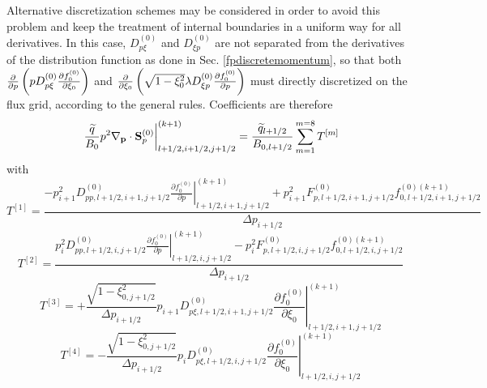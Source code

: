 Alternative discretization schemes may be considered in order to avoid this
problem and keep the treatment of internal boundaries in a uniform way for
all derivatives. In this case, $D_{p\xi }^{\left( 0\right) }$ and $D_{\xi
p}^{\left( 0\right) }$ are not separated from the derivatives of the
distribution function as done in Sec. \ref{fpdiscretemomentum}, so that both 
$\frac{\partial }{\partial p}\left( pD_{p\xi }^{\left( 0\right) }\frac{%
\partial f_{0}^{\left( 0\right) }}{\partial \xi _{0}}\right) $ and $\frac{%
\partial }{\partial \xi _{0}}\left( \sqrt{1-\xi _{0}^{2}}\lambda D_{\xi
p}^{\left( 0\right) }\frac{\partial f_{0}^{\left( 0\right) }}{\partial p}%
\right) $ must directly discretized on the flux grid, according to the
general rules. Coefficients are therefore 
\begin{equation}
\left. \frac{\widetilde{q}}{B_{0}}p^{2}\nabla _{\mathbf{p}}\cdot \mathbf{S}%
_{p}^{\left( 0\right) }\right\vert _{l+1/2,i+1/2,j+1/2}^{(k+1)}=\frac{%
\widetilde{q}_{l+1/2}}{B_{0,l+1/2}}\sum_{m=1}^{m=8}T^{\left[ m\right] }
\end{equation}%
with 
\begin{equation}
T^{\left[ 1\right] }=\frac{-p_{i+1}^{2}D_{pp,l+1/2,i+1,j+1/2}^{\left(
0\right) }\left. \frac{\partial f_{0}^{\left( 0\right) }}{\partial p}%
\right\vert
_{l+1/2,i+1,j+1/2}^{(k+1)}+p_{i+1}^{2}F_{p,l+1/2,i+1,j+1/2}^{\left( 0\right)
}f_{0,l+1/2,i+1,j+1/2}^{\left( 0\right) (k+1)}}{\Delta p_{i+1/2}}
\end{equation}%
\begin{equation}
T^{\left[ 2\right] }=\frac{p_{i}^{2}D_{pp,l+1/2,i,j+1/2}^{\left( 0\right)
}\left. \frac{\partial f_{0}^{\left( 0\right) }}{\partial p}\right\vert
_{l+1/2,i,j+1/2}^{(k+1)}-p_{i}^{2}F_{p,l+1/2,i,j+1/2}^{\left( 0\right)
}f_{0,l+1/2,i,j+1/2}^{\left( 0\right) (k+1)}}{\Delta p_{i+1/2}}
\end{equation}%
\begin{equation}
T^{\left[ 3\right] }=+\frac{\sqrt{1-\xi _{0,j+1/2}^{2}}}{\Delta p_{i+1/2}}%
p_{i+1}D_{p\xi ,l+1/2,i+1,j+1/2}^{\left( 0\right) }\left. \frac{\partial
f_{0}^{\left( 0\right) }}{\partial \xi _{0}}\right\vert
_{l+1/2,i+1,j+1/2}^{(k+1)}
\end{equation}%
\begin{equation}
T^{\left[ 4\right] }=-\frac{\sqrt{1-\xi _{0,j+1/2}^{2}}}{\Delta p_{i+1/2}}%
p_{i}D_{p\xi ,l+1/2,i,j+1/2}^{\left( 0\right) }\left. \frac{\partial
f_{0}^{\left( 0\right) }}{\partial \xi _{0}}\right\vert
_{l+1/2,i,j+1/2}^{(k+1)}
\end{equation}%

